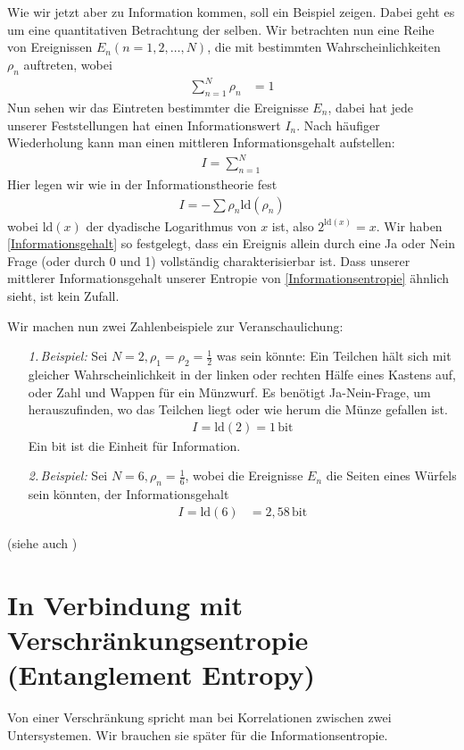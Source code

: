\documentclass[ngerman]{scrartcl}
\begin{document}
Wie wir jetzt aber zu Information kommen, soll ein Beispiel zeigen. Dabei geht es um eine quantitativen Betrachtung der selben.
Wir betrachten nun eine Reihe von Ereignissen $E_n (n = 1, 2, \ldots, N)$, die mit bestimmten Wahrscheinlichkeiten $\rho_n$ auftreten, wobei
	\begin{align}
		\sum_{n=1}^N \rho_n &= 1
	\end{align}
Nun sehen wir das Eintreten bestimmter die Ereignisse $E_n$, dabei hat jede unserer Feststellungen hat einen Informationswert $I_n$. Nach häufiger Wiederholung kann man einen mittleren Informationsgehalt aufstellen:
	\begin{align}
		I = \sum_{n=1}^N
	\end{align}
Hier legen wir wie in der Informationstheorie fest
	\begin{align} \label{Informationsgehalt}
		I = - \sum \rho_n \mathrm{ld}(\rho_n)
	\end{align}
wobei $\mathrm{ld}(x)$ der dyadische Logarithmus von $x$ ist, also $2^{\mathrm{ld}(x)} = x$. 
Wir haben \eqref{Informationsgehalt} so festgelegt, dass ein Ereignis allein durch eine Ja oder Nein Frage (oder durch 0 und 1) vollständig charakterisierbar ist. 
Dass unserer mittlerer Informationsgehalt unserer Entropie von \eqref{Informationsentropie} ähnlich sieht, ist kein Zufall.

Wir machen nun zwei Zahlenbeispiele zur Veranschaulichung:
	\begin{itemize}
		\item[\textit{1.\,Beispiel:}] Sei $N=2, \rho_1 = \rho_2= \frac{1}{2}$ was sein könnte: Ein Teilchen hält sich mit gleicher Wahrscheinlichkeit in der linken oder rechten Hälfe eines Kastens auf, oder Zahl und Wappen für ein Münzwurf.
		Es benötigt Ja-Nein-Frage, um herauszufinden, wo das Teilchen liegt oder wie herum die Münze gefallen ist.
			\begin{align}
				I = \mathrm{ld}(2) = 1 \,\mathrm{bit}
			\end{align}
		Ein bit ist die Einheit für Information.
		\item[\textit{2.\,Beispiel:}]Sei $N=6, \rho_n = \frac{1}{6}$, wobei die Ereignisse $E_n$ die Seiten eines Würfels sein könnten, der Informationsgehalt
			\begin{align}
				I = \mathrm{ld}(6) &= 2,58 \,\mathrm{bit}
			\end{align}
	\end{itemize}
(siehe auch \cite{Brenig})

\section{In Verbindung mit Verschränkungsentropie (Entanglement Entropy)} %
	Von einer Verschränkung spricht man bei Korrelationen zwischen zwei Untersystemen. Wir brauchen sie später für die Informationsentropie.
		
\end{document}
